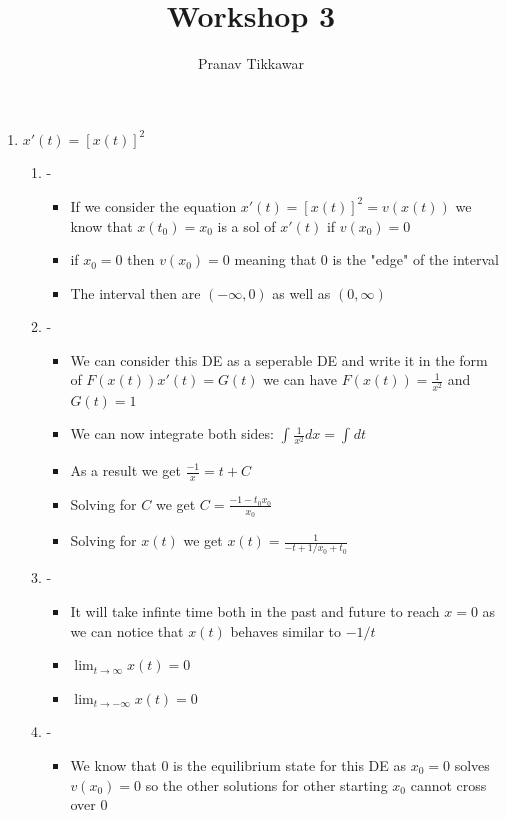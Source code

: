 \documentclass{article}
\author{Pranav Tikkawar}
\title{Workshop 3}
\begin{document}
\maketitle
\begin{enumerate}
    \item $x'(t) = [x(t)]^2 $
    \begin{enumerate}
        \item - \begin{itemize}
            \item  If we consider the equation $x'(t) = [x(t)]^2 = v(x(t))$ we know that $x(t_0) = x_0  $ is a sol of $x'(t)$ if $v(x_0) =0$
            \item if $x_0 = 0$ then $v(x_0) = 0 $ meaning that $0$ is the "edge" of the interval
            \item The interval then are $(-\infty , 0)$ as well as $(0 , \infty)$ 
        \end{itemize}
        \item - \begin{itemize}
            \item We can consider this DE as a seperable DE and write it in the form of $F(x(t))x'(t) = G(t) $ we can have $F(x(t)) = \frac{1}{x^2}$ and $G(t) = 1 $
            \item We can now integrate both sides: $\int_{}^{}\frac{1}{x^2}dx = \int_{}^{}dt $
            \item As a result we get $\frac{-1}{x} = t + C $
            \item Solving for $C$ we get $C = \frac{-1-t_0x_0}{x_0} $
            \item Solving for $x(t)$ we get $x(t) = \frac{1}{-t +1/x_0 + t_0}$  
        \end{itemize}
        \item - \begin{itemize}
            \item It will take infinte time both in the past and future to reach $x=0$ as we can notice that $x(t)$ behaves similar to $-1/t$ 
            \item $\lim_{t \rightarrow \infty}x(t) = 0$ 
            \item $\lim_{t \rightarrow -\infty}x(t) = 0$
        \end{itemize}
        \item - \begin{itemize}
            \item We know that $0$ is the equilibrium state for this DE as $x_0 = 0$ solves $v(x_0) = 0$ so the other solutions for other starting $x_0$ cannot cross over $0$

\end{itemize}
\end{enumerate}
\end{enumerate}
\end{document}
